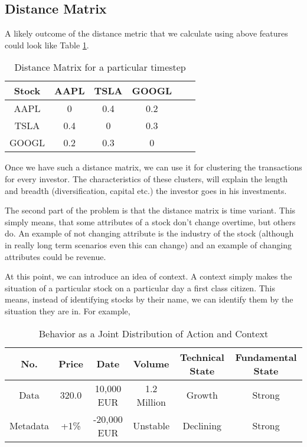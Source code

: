 \documentclass[a4paper]{article}
\begin{document}
\subsection{Distance Matrix}
A likely outcome of the distance metric that we calculate using above features could look like Table \ref{distMatrix}.   
\begin{table}[!htbp]
\centering
\caption{Distance Matrix for a particular timestep}
\begin{tabular}{|c|c|c|c|c|c|} \hline
Stock & AAPL & TSLA & GOOGL\\ \hline
AAPL & 0 & 0.4 & 0.2\\ \hline
TSLA & 0.4 & 0 & 0.3\\\hline
GOOGL & 0.2 & 0.3 & 0\\ \hline
\end{tabular}
\label{distMatrix}
\end{table}
Once we have such a distance matrix, we can use it for clustering the transactions for every investor. The characteristics of these clusters, will explain the length and breadth (diversification, capital etc.) the investor goes in his investments.

The second part of the problem is that the distance matrix is time variant. This simply means, that some attributes of a stock don't change overtime, but others do. An example of not changing attribute is the industry of the stock (although in really long term scenarios even this can change) and an example of changing attributes could be revenue. 

At this point, we can introduce an idea of context. A context simply makes the situation of a particular stock on a particular day a first class citizen. This means, instead of identifying stocks by their name, we can identify them by the situation they are in. For example, 
\begin{table}[!htbp]
\centering
\caption{Behavior as a Joint Distribution of Action and Context}
\begin{tabular}{|c|c|c|c|c|c|} \hline
No. & Price & Date & Volume & Technical State & Fundamental State\\ \hline
Data & 320.0 & 10,000 EUR & 1.2 Million & Growth & Strong\\
Metadata & +1\% & -20,000 EUR & Unstable & Declining & Strong\\\hline
\hline\end{tabular}
\end{table}
\end{document}
